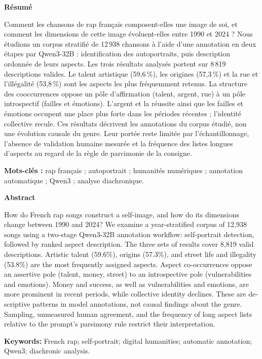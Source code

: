 \documentclass[a4paper,11pt]{article}
\newcommand{\pct}{\,\%}
\newcommand{\rubrique}[1]{\par\medskip\textbf{#1}\par}
\begin{document}
\rubrique{Résumé}
Comment les chansons de rap français composent-elles une image de soi, et
comment les dimensions de cette image évoluent-elles entre 1990 et 2024 ?
Nous étudions un corpus stratifié de 12\,938 chansons à l'aide d'une annotation
en deux étapes par Qwen3-32B : identification des autoportraits, puis description
ordonnée de leurs aspects. Les trois résultats analysés portent sur 8\,819
descriptions valides. Le talent artistique (59,6\pct), les origines (57,3\pct)
et la rue et l'illégalité (53,8\pct) sont les aspects les plus fréquemment
retenus. La structure des cooccurrences oppose un pôle d'affirmation
(talent, argent, rue) à un pôle introspectif (failles et émotions).
L'argent et la réussite ainsi que les failles et émotions occupent
une place plus forte dans les périodes récentes ; l'identité collective
recule. Ces résultats décrivent les annotations du corpus étudié, non une
évolution causale du genre. Leur portée reste limitée par l'échantillonnage,
l'absence de validation humaine mesurée et la fréquence des listes longues
d'aspects au regard de la règle de parcimonie de la consigne.

\textbf{Mots-clés :} rap français ; autoportrait ; humanités numériques ;
annotation automatique ; Qwen3 ; analyse diachronique.

\begin{otherlanguage}{english}
\rubrique{Abstract}
How do French rap songs construct a self-image, and how do its dimensions
change between 1990 and 2024? We examine a year-stratified corpus of 12,938
songs using a two-stage Qwen3-32B annotation workflow: self-portrait detection,
followed by ranked aspect description. The three sets of results cover 8,819 valid
descriptions. Artistic talent (59.6\%), origins (57.3\%), and street life and
illegality (53.8\%) are the most frequently assigned aspects. Aspect co-occurrences
oppose an assertive pole (talent, money, street) to an introspective pole
(vulnerabilities and emotions). Money and success,
as well as vulnerabilities and emotions, are more prominent in recent
periods, while collective identity declines. These are descriptive patterns
in model annotations, not causal findings about the genre. Sampling,
unmeasured human agreement, and the frequency of long aspect lists relative
to the prompt's parsimony rule restrict their interpretation.

\textbf{Keywords:} French rap; self-portrait; digital humanities; automatic
annotation; Qwen3; diachronic analysis.
\end{otherlanguage}
\end{document}
